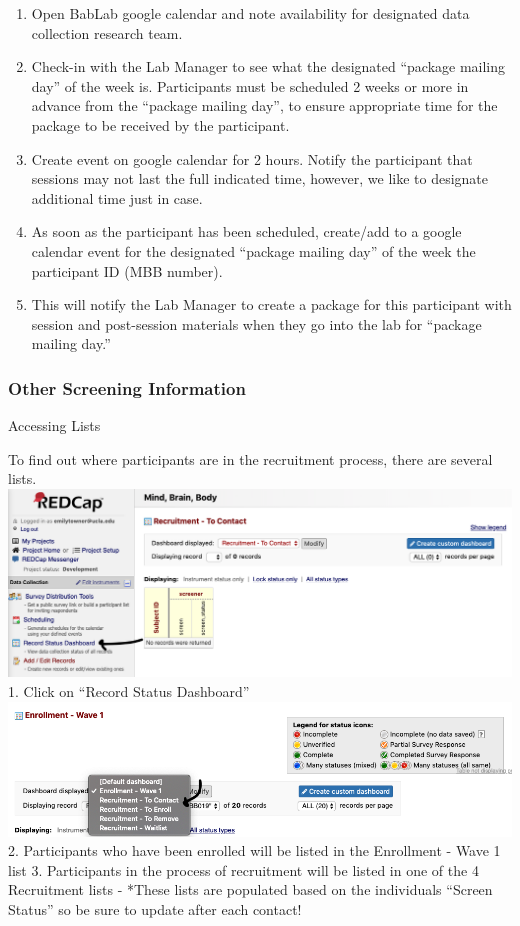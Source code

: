 \documentclass[]{book}
\providecommand{\tightlist}{%
  \setlength{\itemsep}{0pt}\setlength{\parskip}{0pt}}
\begin{document}
\begin{enumerate}
\def\labelenumi{\arabic{enumi}.}
\tightlist
\item
  Open BabLab google calendar and note availability for designated data collection research team.
\item
  Check-in with the Lab Manager to see what the designated ``package mailing day'' of the week is.
  Participants must be scheduled 2 weeks or more in advance from the ``package mailing day'', to ensure appropriate time for the package to be received by the participant.
\item
  Create event on google calendar for 2 hours. Notify the participant that sessions may not last the full indicated time, however, we like to designate additional time just in case.
\item
  As soon as the participant has been scheduled, create/add to a google calendar event for the designated ``package mailing day'' of the week the participant ID (MBB number).
\item
  This will notify the Lab Manager to create a package for this participant with session and post-session materials when they go into the lab for ``package mailing day.''
\end{enumerate}

\hypertarget{other-screening-information-1}{%
\subsubsection{Other Screening Information}\label{other-screening-information-1}}

Accessing Lists

To find out where participants are in the recruitment process, there are several lists.
\includegraphics{images/redcap_screening/7.png}
1. Click on ``Record Status Dashboard''
\includegraphics{images/redcap_screening/8.png}
2. Participants who have been enrolled will be listed in the Enrollment - Wave 1 list
3. Participants in the process of recruitment will be listed in one of the 4 Recruitment lists
- *These lists are populated based on the individuals ``Screen Status'' so be sure to update after each contact!
\end{document}
